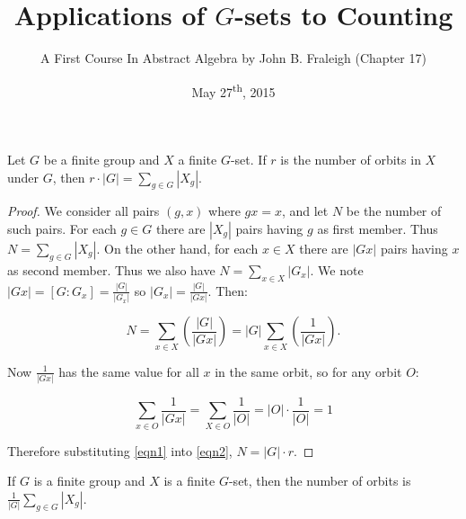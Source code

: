 \documentclass[a4paper,11pt]{article}
\title{Applications of \(G\)-sets to Counting}
\author{A First Course In Abstract Algebra by John B. Fraleigh (Chapter 17)}
\date{May 27\textsuperscript{th}, 2015}
\begin{document}
\maketitle
{}

\begin{outline}

    Let \(G\) be a finite group and \(X\) a finite \(G\)-set. If \(r\) is the number of orbits in \(X\) 
    under \(G\), then \(r \cdot |G| = \sum_{g \in G}|X_g|\).
    
    \begin{proof}
      We consider all pairs \((g, x)\) where \(gx = x\), and let \(N\) be the number of such pairs. For each
      \(g \in G\) there are \(|X_g|\) pairs having \(g\) as first member. Thus \(N = \sum_{g \in G}|X_g|\).
      On the other hand, for each \(x \in X\) there are \(|Gx|\) pairs having \(x\) as second member. Thus we also
      have \(N = \sum_{x \in X} |G_x|\). We note \(|Gx| = [G:G_x] = \frac{|G|}{|G_x|}\) so \(|G_x| = \frac{|G|}{|Gx|}\).
      Then:
      
      \begin{equation}
        \label{eqn1}
        N = \sum_{x \in X}(\frac{|G|}{|Gx|}) = |G|\sum_{x \in X} (\frac{1}{|Gx|}).
      \end{equation}
      
      Now \(\frac{1}{|Gx|}\) has the same value for all \(x\) in the same orbit, so for any orbit \(O\):
      
      \begin{equation}
        \label{eqn2}
        \sum_{x \in O} \frac{1}{|Gx|} = \sum_{X \in O} \frac{1}{|O|} = |O| \cdot \frac{1}{|O|} = 1
      \end{equation}
      
      Therefore substituting \eqref{eqn1} into \eqref{eqn2}, \(N = |G| \cdot r\).
    \end{proof}

    If \(G\) is a finite group and \(X\) is a finite \(G\)-set, then the number of orbits is 
    \(\frac{1}{|G|}\sum_{g \in G}|X_g|\).

\end{outline}
\end{document}
